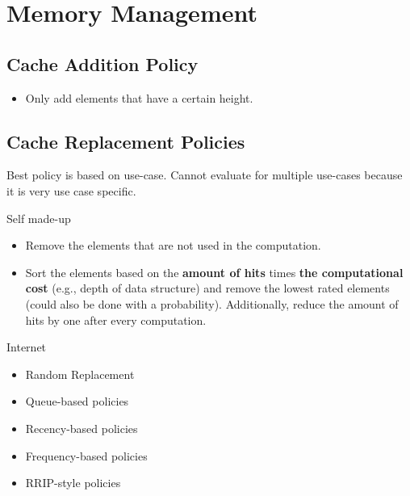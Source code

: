 \section{Memory Management}

\subsection{Cache Addition Policy}


\begin{itemize}
  \item Only add elements that have a certain height.
\end{itemize}

\subsection{Cache Replacement Policies}

Best policy is based on use-case. Cannot evaluate for multiple use-cases because it is very use case specific.

Self made-up
\begin{itemize}
  \item Remove the elements that are not used in the computation.
  \item Sort the elements based on the \textbf{amount of hits} times \textbf{the computational cost} (e.g., depth of data structure) and remove the lowest rated elements (could also be done with a probability). Additionally, reduce the amount of hits by one after every computation.
\end{itemize}

Internet
\begin{itemize}
  \item Random Replacement
  \item Queue-based policies
  \item Recency-based policies
  \item Frequency-based policies
  \item RRIP-style policies
\end{itemize}

